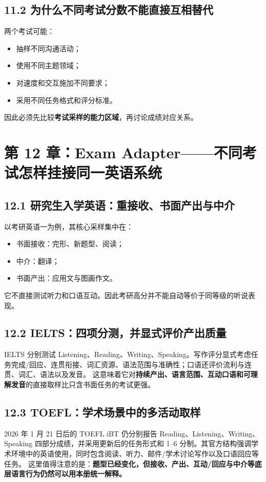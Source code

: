 \documentclass[11pt,a4paper]{ctexart}
\newcommand{\kw}[1]{\textbf{#1}}
\begin{document}
\subsection{11.2 为什么不同考试分数不能直接互相替代}
两个考试可能：
\begin{itemize}
  \item 抽样不同沟通活动；
  \item 使用不同主题领域；
  \item 对速度和交互施加不同要求；
  \item 采用不同任务格式和评分标准。
\end{itemize}
因此必须先比较\kw{考试采样的能力区域}，再讨论成绩对应关系。

\section{第 12 章：Exam Adapter——不同考试怎样挂接同一英语系统}

\subsection{12.1 研究生入学英语：重接收、书面产出与中介}
以考研英语一为例，其核心采样集中在：
\begin{itemize}
  \item 书面接收：完形、新题型、阅读；
  \item 中介：翻译；
  \item 书面产出：应用文与图画作文。
\end{itemize}
它不直接测试听力和口语互动。因此考研高分并不能自动等价于同等级的听说表现。

\subsection{12.2 IELTS：四项分测，并显式评价产出质量}
IELTS 分别测试 Listening、Reading、Writing、Speaking。写作评分显式考虑任务完成/回应、连贯衔接、词汇资源、语法范围与准确性；口语还评价流利与连贯、词汇、语法以及发音。
这意味着它对\kw{持续产出、语言范围、互动口语和可理解发音}的直接取样比只含书面任务的考试更强。

\subsection{12.3 TOEFL：学术场景中的多活动取样}
2026 年 1 月 21 日后的 TOEFL iBT 仍分别报告 Reading、Listening、Writing、Speaking 四部分成绩，并采用更新后的任务形式和 1--6 分制。其官方结构强调学术环境中的英语使用，同时包含阅读、听力、邮件/学术讨论写作以及口语回应等任务。
这里值得注意的是：\kw{题型已经变化，但接收、产出、互动/回应与中介等底层语言行为仍然可以用本册统一解释。}
\end{document}

